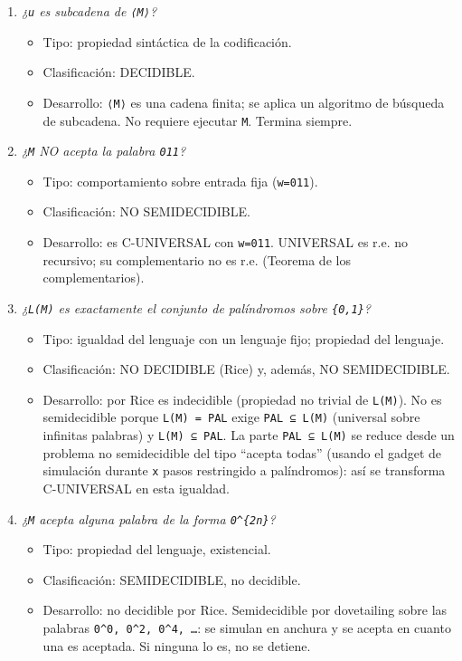 \documentclass[12pt]{book} %
\providecommand{\tightlist}{%
  \setlength{\itemsep}{0pt}\setlength{\parskip}{0pt}}
\begin{document}
\begin{enumerate}
\def\labelenumi{\arabic{enumi}.}
\tightlist
\item
  \emph{¿\texttt{u} es subcadena de \texttt{⟨M⟩}?}

  \begin{itemize}
  \tightlist
  \item
    Tipo: propiedad sintáctica de la codificación.
  \item
    Clasificación: DECIDIBLE.
  \item
    Desarrollo: \texttt{⟨M⟩} es una cadena finita; se aplica un
    algoritmo de búsqueda de subcadena. No requiere ejecutar \texttt{M}.
    Termina siempre.
  \end{itemize}
\item
  \emph{¿\texttt{M} NO acepta la palabra \texttt{011}?}

  \begin{itemize}
  \tightlist
  \item
    Tipo: comportamiento sobre entrada fija (\texttt{w=011}).
  \item
    Clasificación: NO SEMIDECIDIBLE.
  \item
    Desarrollo: es C-UNIVERSAL con \texttt{w=011}. UNIVERSAL es r.e. no
    recursivo; su complementario no es r.e. (Teorema de los
    complementarios).
  \end{itemize}
\item
  \emph{¿\texttt{L(M)} es exactamente el conjunto de palíndromos sobre
  \texttt{\{0,1\}}?}

  \begin{itemize}
  \tightlist
  \item
    Tipo: igualdad del lenguaje con un lenguaje fijo; propiedad del
    lenguaje.
  \item
    Clasificación: NO DECIDIBLE (Rice) y, además, NO SEMIDECIDIBLE.
  \item
    Desarrollo: por Rice es indecidible (propiedad no trivial de
    \texttt{L(M)}). No es semidecidible porque \texttt{L(M)\ =\ PAL}
    exige \texttt{PAL\ ⊆\ L(M)} (universal sobre infinitas palabras) y
    \texttt{L(M)\ ⊆\ PAL}. La parte \texttt{PAL\ ⊆\ L(M)} se reduce
    desde un problema no semidecidible del tipo ``acepta todas'' (usando
    el gadget de simulación durante \texttt{\textbar{}x\textbar{}} pasos
    restringido a palíndromos): así se transforma C-UNIVERSAL en esta
    igualdad.
  \end{itemize}
\item
  \emph{¿\texttt{M} acepta alguna palabra de la forma
  \texttt{0\^{}\{2n\}}?}

  \begin{itemize}
  \tightlist
  \item
    Tipo: propiedad del lenguaje, existencial.
  \item
    Clasificación: SEMIDECIDIBLE, no decidible.
  \item
    Desarrollo: no decidible por Rice. Semidecidible por dovetailing
    sobre las palabras \texttt{0\^{}0,\ 0\^{}2,\ 0\^{}4,\ …}: se simulan
    en anchura y se acepta en cuanto una es aceptada. Si ninguna lo es,
    no se detiene.
  \end{itemize}
\end{enumerate}
\end{document}
